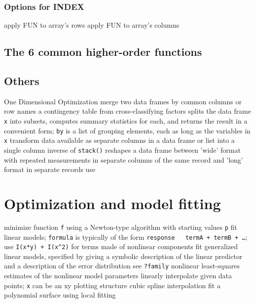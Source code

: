 \subsubsection{Options for INDEX}
	{apply FUN to array's rows}
	{apply FUN to array's columns}

\subsection{The 6 common higher-order functions}{}

\subsection{Others}{}
	{One Dimensional Optimization}
	{merge two data frames by com\-mon col\-umns or row names}
	{a contingency table from cross-classi\-fy\-ing factors}
	{splits the data frame {\tt x} into subsets,
computes summary statistics for each, and returns the result in a convenient
form; {\tt by} is a list of grouping elements, each as long as the variables in
{\tt x}}
	{transform data available as se\-pa\-rate col\-umns in
a data frame or list into a single column}
	{inverse of {\tt stack()}}
	{reshapes a data frame between 'wide' format
    with re\-pea\-ted mea\-sure\-ments in separate
    columns of the same record and 'long' format in separate records}
	{use}

\section{Optimization and model fitting}{}
	{minimize function {\tt f} using a Newton-type algorithm with
starting values {\tt p}}
	{fit linear models; {\tt formula} is typically of the form
{\tt response ~ termA + termB + \ldots}; use {\tt I(x*y) + I(x\^{}2)} for terms
made of nonlinear components}
	{fit generalized linear models, specified by giving
a symbolic description of the linear predictor and a description of the error
distribution}
	{see {\tt ?family}}
	{nonlinear least-squares estimates of the nonlinear model
parameters}
	{linearly interpolate given data points; {\tt x} can be an
xy plotting structure}
	{cubic spline interpolation}
	{fit a polynomial surface using local fitting}

